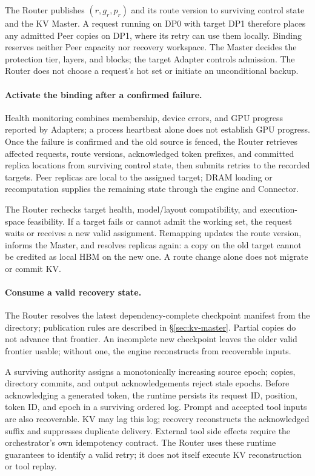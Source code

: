 The Router publishes $(r,g_r,p_r)$ and its route version to surviving
control state and the KV Master. A request running on DP0 with target
DP1 therefore places any admitted Peer copies on DP1, where its retry
can use them locally. Binding reserves neither Peer capacity nor recovery
workspace. The Master decides the protection tier, layers, and blocks;
the target Adapter controls admission. The Router does not choose a
request's hot set or initiate an unconditional backup.

\paragraph{Activate the binding after a confirmed failure.}
Health monitoring combines membership, device errors, and GPU progress
reported by Adapters; a process heartbeat alone does not establish GPU
progress. Once the failure is confirmed and the old source is fenced,
the Router retrieves affected requests, route versions, acknowledged
token prefixes, and committed replica locations from surviving control
state, then submits retries to the recorded targets. Peer replicas are
local to the assigned target; DRAM loading or recomputation supplies the
remaining state through the engine and Connector.

The Router rechecks target health, model/layout compatibility, and
execution-space feasibility. If a target fails or cannot admit the
working set, the request waits or receives a new valid assignment.
Remapping updates the route version, informs the Master, and resolves
replicas again: a copy on the old target cannot be credited as local
HBM on the new one. A route change alone does not migrate or commit KV.

\paragraph{Consume a valid recovery state.}
The Router resolves the latest dependency-complete checkpoint manifest
from the directory; publication rules are described in
\S\ref{sec:kv-master}. Partial copies do not advance that frontier.
An incomplete new checkpoint leaves the older valid frontier usable;
without one, the engine reconstructs from recoverable inputs.

A surviving authority assigns a monotonically increasing source epoch;
copies, directory commits, and output acknowledgements reject stale epochs.
Before acknowledging a generated token, the runtime persists its request
ID, position, token ID, and epoch in a surviving ordered log. Prompt and
accepted tool inputs are also recoverable. KV may lag this log; recovery
reconstructs the acknowledged suffix and suppresses duplicate delivery.
External tool side effects require the orchestrator's own idempotency
contract. The Router uses these runtime guarantees to identify a valid
retry; it does not itself execute KV reconstruction or tool replay.

